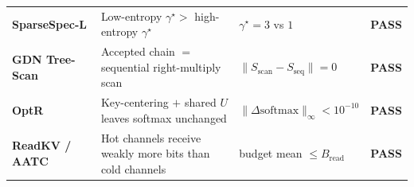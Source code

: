 \documentclass[10pt,a4paper]{article}
\begin{document}
\begin{table}[h!]
\begin{tabular}{@{}llll@{}}
\textbf{SparseSpec-L} & Low-entropy $\gamma^\star >$ high-entropy $\gamma^\star$ & $\gamma^\star = 3$ vs $1$ & \textbf{PASS} \\
\textbf{GDN Tree-Scan} & Accepted chain $=$ sequential right-multiply scan & $\lVert S_{\mathrm{scan}}-S_{\mathrm{seq}}\rVert = 0$ & \textbf{PASS} \\
\textbf{OptR} & Key-centering $+$ shared $U$ leaves softmax unchanged & $\lVert\Delta\mathrm{softmax}\rVert_\infty < 10^{-10}$ & \textbf{PASS} \\
\textbf{ReadKV / AATC} & Hot channels receive weakly more bits than cold channels & budget mean $\le B_{\mathrm{read}}$ & \textbf{PASS} \\
\bottomrule
\end{tabular}
\end{table}
\end{document}

